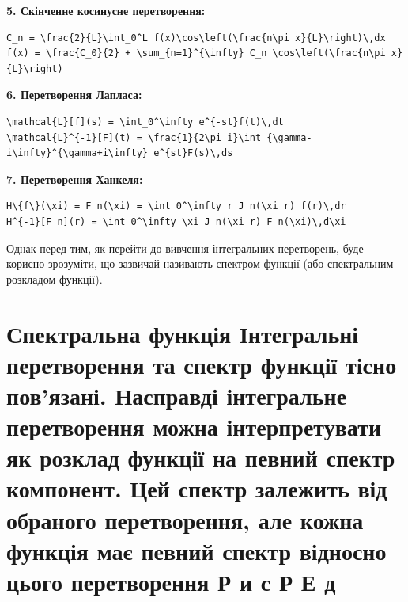 \documentclass[
  ukrainian,
]{article}
\begin{document}
\textbf{5. Скінченне косинусне перетворення:}

\begin{verbatim}
C_n = \frac{2}{L}\int_0^L f(x)\cos\left(\frac{n\pi x}{L}\right)\,dx
f(x) = \frac{C_0}{2} + \sum_{n=1}^{\infty} C_n \cos\left(\frac{n\pi x}{L}\right)
\end{verbatim}

\textbf{6. Перетворення Лапласа:}

\begin{verbatim}
\mathcal{L}[f](s) = \int_0^\infty e^{-st}f(t)\,dt
\mathcal{L}^{-1}[F](t) = \frac{1}{2\pi i}\int_{\gamma-i\infty}^{\gamma+i\infty} e^{st}F(s)\,ds
\end{verbatim}

\textbf{7. Перетворення Ханкеля:}

\begin{verbatim}
H\{f\}(\xi) = F_n(\xi) = \int_0^\infty r J_n(\xi r) f(r)\,dr
H^{-1}[F_n](r) = \int_0^\infty \xi J_n(\xi r) F_n(\xi)\,d\xi
\end{verbatim}

Однак перед тим, як перейти до вивчення інтегральних перетворень, буде
корисно зрозуміти, що зазвичай називають спектром функції (або
спектральним розкладом функції).

\section{Спектральна функція Інтегральні перетворення та спектр функції
тісно пов'язані. Насправді інтегральне перетворення можна інтерпретувати
як розклад функції на певний спектр компонент. Цей спектр залежить від
обраного перетворення, але кожна функція має певний спектр відносно
цього перетворення Р и с Р Е
д}\label{ux441ux43fux435ux43aux442ux440ux430ux43bux44cux43dux430-ux444ux443ux43dux43aux446ux456ux44f-ux456ux43dux442ux435ux433ux440ux430ux43bux44cux43dux456-ux43fux435ux440ux435ux442ux432ux43eux440ux435ux43dux43dux44f-ux442ux430-ux441ux43fux435ux43aux442ux440-ux444ux443ux43dux43aux446ux456ux457-ux442ux456ux441ux43dux43e-ux43fux43eux432ux44fux437ux430ux43dux456.-ux43dux430ux441ux43fux440ux430ux432ux434ux456-ux456ux43dux442ux435ux433ux440ux430ux43bux44cux43dux435-ux43fux435ux440ux435ux442ux432ux43eux440ux435ux43dux43dux44f-ux43cux43eux436ux43dux430-ux456ux43dux442ux435ux440ux43fux440ux435ux442ux443ux432ux430ux442ux438-ux44fux43a-ux440ux43eux437ux43aux43bux430ux434-ux444ux443ux43dux43aux446ux456ux457-ux43dux430-ux43fux435ux432ux43dux438ux439-ux441ux43fux435ux43aux442ux440-ux43aux43eux43cux43fux43eux43dux435ux43dux442.-ux446ux435ux439-ux441ux43fux435ux43aux442ux440-ux437ux430ux43bux435ux436ux438ux442ux44c-ux432ux456ux434-ux43eux431ux440ux430ux43dux43eux433ux43e-ux43fux435ux440ux435ux442ux432ux43eux440ux435ux43dux43dux44f-ux430ux43bux435-ux43aux43eux436ux43dux430-ux444ux443ux43dux43aux446ux456ux44f-ux43cux430ux454-ux43fux435ux432ux43dux438ux439-ux441ux43fux435ux43aux442ux440-ux432ux456ux434ux43dux43eux441ux43dux43e-ux446ux44cux43eux433ux43e-ux43fux435ux440ux435ux442ux432ux43eux440ux435ux43dux43dux44f-ux440-ux438-ux441-ux440-ux435-ux434}
\end{document}
